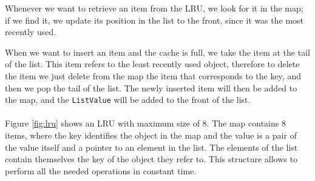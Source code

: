 Whenever we want to retrieve an item from the LRU, we look for it in the map; if we find it, we update its position in the list to the front, since it was the most recently used.

When we want to insert an item and the cache is full, we take the item at the tail of the list. This item refers to the least recently used object, therefore to delete the item we just delete from the map the item that corresponds to the key, and then we pop the tail of the list. The newly inserted item will then be added to the map, and the \texttt{ListValue} will be added to the front of the list.
\\\\
Figure \ref{fig:lru} shows an LRU with maximum size of 8. The map contains 8 items, where the key identifies the object in the map and the value is a pair of the value itself and a pointer to an element in the list. The elements of the list contain themselves the key of the object they refer to. This structure allows to perform all the needed operations in constant time. 

